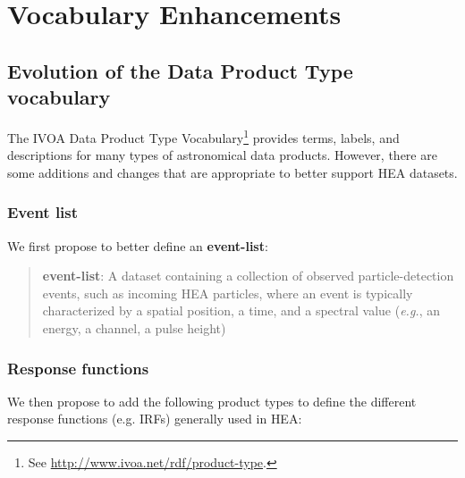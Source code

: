 \documentclass[11pt,a4paper]{ivoa}
\begin{document}
\section{Vocabulary Enhancements}
\label{sec:voc}

\subsection{Evolution of the Data Product Type vocabulary}
\label{sec:voc_product_type}

The \gls{IVOA} Data Product Type Vocabulary\footnote{See \url{http://www.ivoa.net/rdf/product-type}.} provides terms, labels, and descriptions for many types of astronomical data products. However, there are some additions and changes that are appropriate to better support \gls{HEA} datasets.


\subsubsection{Event list}

We first propose to better define an {\bf event-list}:

\begin{quote}
{\bf event-list}: A dataset containing a collection of observed particle-detection events, such as incoming \gls{HEA} particles, where an event is typically characterized by a spatial position, a time, and a spectral value ({\em e.g.\/}, an energy, a channel, a pulse height)
\end{quote}

\subsubsection{Response functions}
\label{sec:responsefct}

We then propose to add the following product types to define the different response functions (e.g. \glspl{IRF}) generally used in \gls{HEA}:
\end{document}
